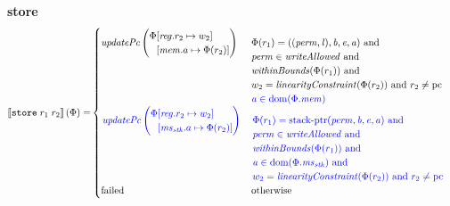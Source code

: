 \documentclass[a4paper]{article}
\begin{document}
\noindent\textbf{store}\\
\begin{align*}
  \sem{\tstore{r_1}{r_2}}(\Phi) = &
                                    \begin{cases}
                                      \updPcAddr{}\left(
                                        \arraycolsep=0pt
                                        \begin{array}{rl}
                                          \Phi&\updReg{r_2}{w_2}\\
                                              &\update{\mem.a}{\Phi(r_2)}
                                        \end{array}
\right) & 
                                      \arraycolsep=0pt
                                      \begin{array}[t]{l}
                                        \Phi(r_1) = ((\perm,\lin),\baddr,\eaddr,\aaddr) \tand \\
                                        \perm \in \writeAllowed{} \tand\\
                                        \withinBounds{\Phi(r_1)} \tand \\
                                        w_2 = \linCons{\Phi(r_2)} \tand r_2 \neq \pcreg\\
                                        \src{\aaddr \in \dom(\Phi.\mem)}
                                      \end{array}
                                      \\
                                      \sourcecolor\left.
                                      \updPcAddr{}\left(
                                      \arraycolsep=0pt
                                      \begin{array}{rl}
                                        \Phi&\updReg{r_2}{w_2}\\
                                            &\update{\ms_\stk.a}{\Phi(r_2)}
                                      \end{array}
                                      \right) \right.& 
                                      \sourcecolor\left.
                                      \arraycolsep=0pt
                                      \begin{array}[t]{l}
                                        \Phi(r_1) = \stkptr{\perm,\baddr,\eaddr,\aaddr} \tand \\
                                        \perm \in \writeAllowed{} \tand \\
                                        \withinBounds{\Phi(r_1)} \tand \\
                                        \aaddr \in \dom(\Phi.\ms_\stk) \tand \\
                                        w_2 = \linCons{\Phi(r_2)} \tand r_2 \neq \pcreg
                                      \end{array}\right.\\
                                      \failed & \totherwise
                                    \end{cases}
\end{align*}
\end{document}
